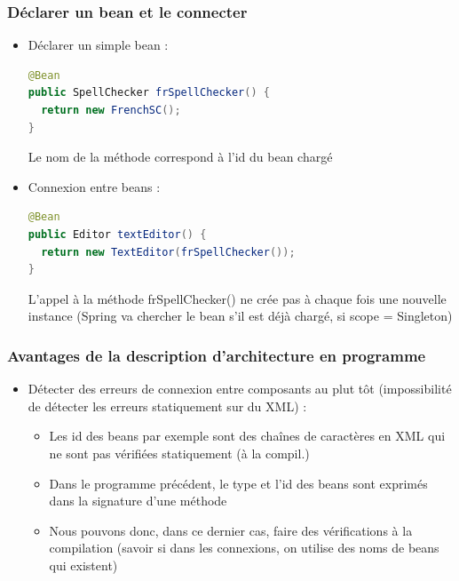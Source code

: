 \documentclass{beamer}
\begin{document}
\begin{frame}[fragile]
  \frametitle{Déclarer un bean et le connecter}
  \begin{itemize}
  \item Déclarer un simple bean :
\begin{lstlisting}[language=Java,basicstyle=\scriptsize]          
@Bean
public SpellChecker frSpellChecker() {
  return new FrenchSC();
}
\end{lstlisting}
Le nom de la méthode correspond à l'id du bean chargé
\item Connexion entre beans :
\begin{lstlisting}[language=Java,basicstyle=\scriptsize]            
@Bean
public Editor textEditor() {
  return new TextEditor(frSpellChecker());
}
\end{lstlisting}
L'appel à la méthode frSpellChecker() ne crée pas à chaque fois
une nouvelle instance (Spring va chercher le bean s'il est déjà
chargé, si scope = Singleton)
\end{itemize}
\end{frame}

\begin{frame}[fragile]
  \frametitle{Avantages de la description d'architecture en programme}
  \begin{itemize}
  \item Détecter des erreurs de connexion entre composants au plut tôt
    (impossibilité de détecter les erreurs statiquement sur du XML) :
    \begin{itemize}
    \item Les id des beans par exemple sont des chaînes de caractères
      en XML qui ne sont pas vérifiées statiquement (à la compil.)
    \item Dans le programme précédent, le type et l'id des beans sont
      exprimés dans la signature d'une méthode
    \item Nous pouvons donc, dans ce dernier cas, faire des
      vérifications à la compilation (savoir si dans les connexions,
      on utilise des noms de beans qui existent)
    \end{itemize}
\end{itemize}
\end{frame}
\end{document}
